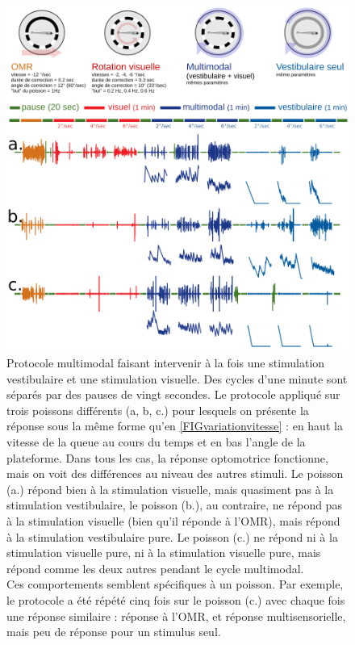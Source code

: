 \begin{figure}
    \centering
    \includegraphics[width=\textwidth]{./files/protocole_multimodal.svg.png}
    \caption{
    Protocole multimodal faisant intervenir à la fois une stimulation vestibulaire et une stimulation visuelle. Des cycles d'une minute sont séparés par des pauses de vingt secondes.
    Le protocole appliqué sur trois poissons différents (a, b, c.) pour lesquels on présente la réponse sous la même forme qu'en \ref{FIGvariationvitesse} : en haut la vitesse de la queue au cours du temps et en bas l'angle de la plateforme. Dans tous les cas, la réponse optomotrice fonctionne, mais on voit des différences au niveau des autres stimuli. Le poisson (a.) répond bien à la stimulation visuelle, mais quasiment pas à la stimulation vestibulaire, le poisson (b.), au contraire, ne répond pas à la stimulation visuelle (bien qu'il réponde à l'OMR), mais répond à la stimulation vestibulaire pure. Le poisson (c.) ne répond ni à la stimulation visuelle pure, ni à la stimulation visuelle pure, mais répond comme les deux autres pendant le cycle multimodal.
    \\ Ces comportements semblent spécifiques à un poisson. Par exemple, le protocole a été répété cinq fois sur le poisson (c.) avec chaque fois une réponse similaire : réponse à l'OMR, et réponse multisensorielle, mais peu de réponse pour un stimulus seul.
    \label{FIGprotocolmulti}}
    \end{figure}

